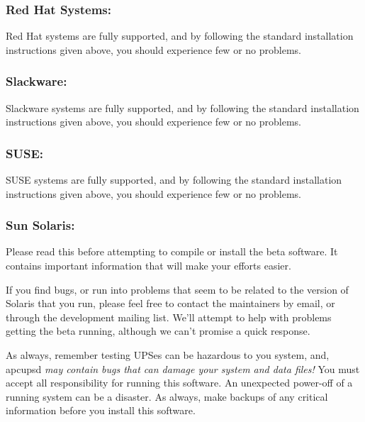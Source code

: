 \label{Red-Hat-Systems}

\subsubsection*{Red Hat Systems:}

\label{index-Red-Hat-44}
\label{index-OS_002c-Red-Hat-45}
Red Hat systems are fully supported, and by following the standard
installation instructions given above, you should experience few or no
problems. 

\label{Slackware}

\subsubsection*{Slackware:}

\label{index-Slackware-46}
\label{index-OS_002c-Slackware-47}
Slackware systems are fully supported, and by following the standard
installation instructions given above, you should experience few or no
problems. 

\label{SUSE}

\subsubsection*{SUSE:}

\label{index-SuSE-48}
\label{index-OS_002c-SuSE-49}
SUSE systems are fully supported, and by following the standard installation
instructions given above, you should experience few or no problems. 

\label{Sun-Solaris}

\subsubsection*{Sun Solaris:}

\label{index-Sun-50}
\label{index-Solaris-51}
\label{index-OS_002c-Solaris-52}
Please read this before attempting to compile or install the beta software. It
contains important information that will make your efforts easier.  

If you find bugs, or run into problems that seem to be related to the version
of Solaris that you run, please feel free to contact the maintainers by email,
or through the development mailing list. We'll attempt to help with problems
getting the beta running, although we can't promise a quick response.  

As always, remember testing UPSes can be hazardous to you system, and, apcupsd
{\it may contain bugs that can damage your system and data files!} You must
accept all responsibility for running this software. An unexpected power-off
of a running system can be a disaster. As always, make backups of any critical
information before you install this software.  


